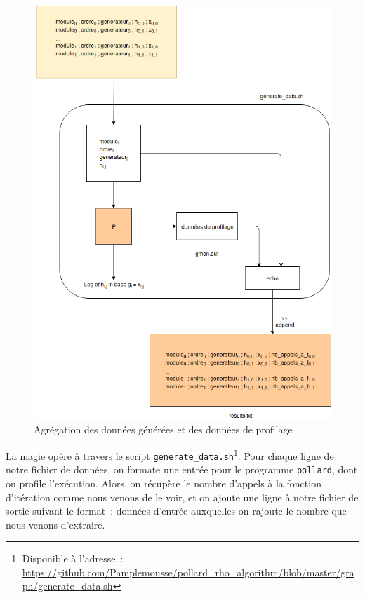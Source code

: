      \begin{figure}
        \center{}
        \includegraphics[scale=0.3]{images/generate_measurement_data.png}
        \caption{Agrégation des données générées et des données de profilage}
        \label{fig:generate_measurement_data}
      \end{figure}

      La magie opère à travers le script \lstinline{generate_data.sh}\footnote{Disponible à l'adresse~: \url{https://github.com/Pamplemousse/pollard_rho_algorithm/blob/master/graph/generate_data.sh}}.
      Pour chaque ligne de notre fichier de données, on formate une entrée pour le programme \lstinline{pollard}, dont on profile l'exécution.
      Alors, on récupère le nombre d'appels à la fonction d'itération comme nous venons de le voir, et on ajoute une ligne à notre fichier de sortie suivant le format~: données d'entrée auxquelles on rajoute le nombre que nous venons d'extraire.

